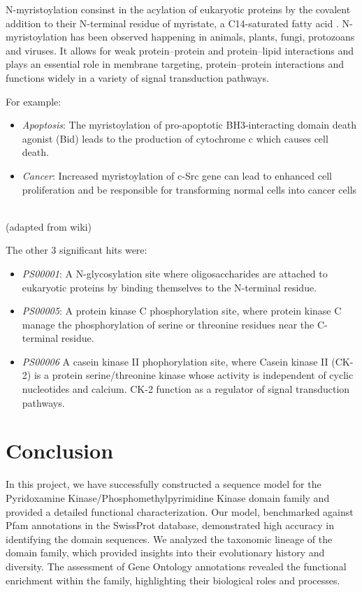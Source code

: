 \documentclass[10pt,twocolumn,letterpaper]{article}
\begin{document}
N-myristoylation consinst in the acylation of eukaryotic proteins by the covalent addition to their N-terminal residue of myristate, a C14-saturated fatty acid \cite{N-myristoylation}.
N-myristoylation has been observed happening in animals, plants, fungi, protozoans and viruses. It allows for weak protein–protein and protein–lipid interactions and plays an essential role in membrane targeting, protein–protein interactions and functions widely in a variety of signal transduction pathways. 

For example:
\begin{itemize}
    \item \textit{Apoptosis}: The myristoylation of pro-apoptotic BH3-interacting domain death agonist (Bid) leads to the production of cytochrome c which causes cell death.

    \item \textit{Cancer}: Increased myristoylation of c-Src gene can lead to enhanced cell proliferation and be responsible for transforming normal cells into cancer cells
\end{itemize} \\

(adapted from wiki)

The other 3 significant hits were: 
\begin{itemize}
\item \textit{PS00001}: A N-glycosylation site where oligosaccharides are attached to eukaryotic proteins by binding themselves to the N-terminal residue.
\item \textit{PS00005}: A protein kinase C phosphorylation site, where protein kinase C manage the phosphorylation of serine or threonine residues near the C-terminal residue.
\item \textit{PS00006} A casein kinase II phophorylation site, where Casein kinase II (CK-2) is a protein serine/threonine kinase whose activity is independent of cyclic nucleotides and calcium. CK-2 function as a regulator of signal transduction pathways.
\end{itemize}



\section{Conclusion}

In this project, we have successfully constructed a sequence model for the Pyridoxamine Kinase/Phosphomethylpyrimidine Kinase domain family and provided a detailed functional characterization. Our model, benchmarked against Pfam annotations in the SwissProt database, demonstrated high accuracy in identifying the domain sequences. We analyzed the taxonomic lineage of the domain family, which provided insights into their evolutionary history and diversity. The assessment of Gene Ontology annotations revealed the functional enrichment within the family, highlighting their biological roles and processes.
\end{document}
